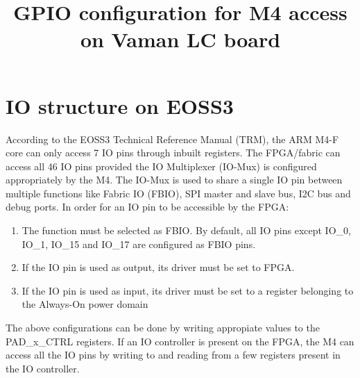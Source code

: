 \documentclass[journal,10pt]{article}
\title{\textbf{GPIO configuration for M4 access on Vaman LC board}}
\begin{document}
\maketitle

\section{\large IO structure on EOSS3}
According to the EOSS3 Technical Reference Manual (TRM), the ARM M4-F core can only access 7 IO pins through inbuilt registers. The FPGA/fabric can access all 46 IO pins provided the IO Multiplexer (IO-Mux) is configured appropriately by the M4. The IO-Mux is used to share a single IO pin between multiple functions like Fabric IO (FBIO), SPI master and slave bus, I2C bus and debug ports. In order for an IO pin to be accessible by the FPGA:
\begin{enumerate}
	\item The function must be selected as FBIO. By default, all IO pins except IO\_0, IO\_1, IO\_15 and IO\_17 are configured as FBIO pins.
	\item If the IO pin is used as output, its driver must be set to FPGA.
	\item If the IO pin is used as input, its driver must be set to a register belonging to the Always-On power domain
\end{enumerate}
The above configurations can be done by writing appropiate values to the PAD\_x\_CTRL registers. If an IO controller is present on the FPGA, the M4 can access all the IO pins by writing to and reading from a few registers present in the IO controller.
\end{document}
